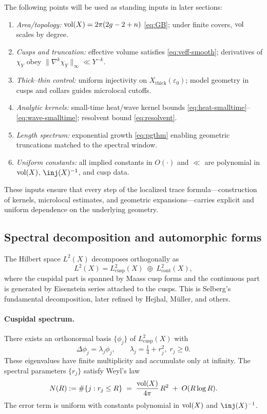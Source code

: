 The following points will be used as standing inputs in later sections:
\begin{enumerate}
  \item \emph{Area/topology:} $\operatorname{vol}(X)=2\pi(2g-2+n)$ \eqref{eq:GB}; under finite covers, $\operatorname{vol}$ scales by degree.
  \item \emph{Cusps and truncation:} effective volume satisfies \eqref{eq:veff-smooth}; derivatives of $\chi_Y$ obey $\|\nabla^k\chi_Y\|_\infty\ll Y^{-k}$.
  \item \emph{Thick--thin control:} uniform injectivity on $X_{\mathrm{thick}}(\varepsilon_0)$; model geometry in cusps and collars guides microlocal cutoffs.
  \item \emph{Analytic kernels:} small-time heat/wave kernel bounds \eqref{eq:heat-smalltime}–\eqref{eq:wave-smalltime}; resolvent bound \eqref{eq:resolvent}.
  \item \emph{Length spectrum:} exponential growth \eqref{eq:pgthm} enabling geometric truncations matched to the spectral window.
  \item \emph{Uniform constants:} all implied constants in $O(\cdot)$ and $\ll$ are polynomial in $\operatorname{vol}(X)$, $\inj(X)^{-1}$, and cusp data.
\end{enumerate}
These inputs ensure that every step of the localized trace formula—construction of kernels, microlocal estimates, and geometric expansions—carries explicit and uniform dependence on the underlying geometry.

\subsection{Spectral decomposition and automorphic forms}\label{subsec:spectral}

The Hilbert space $L^2(X)$ decomposes orthogonally as
\begin{equation}\label{eq:L2dec}
  L^2(X) = L^2_{\mathrm{cusp}}(X) \;\oplus\; L^2_{\mathrm{cont}}(X),
\end{equation}
where the cuspidal part is spanned by Maass cusp forms and the continuous part is generated by Eisenstein series attached to the cusps. This is Selberg’s fundamental decomposition, later refined by Hejhal, Müller, and others.

\paragraph{Cuspidal spectrum.}
There exists an orthonormal basis $\{\phi_j\}$ of $L^2_{\mathrm{cusp}}(X)$ with
\begin{equation}\label{eq:Laplace-cusp}
  \Delta \phi_j = \lambda_j \phi_j, \qquad \lambda_j = \tfrac14 + r_j^2,\; r_j\ge 0.
\end{equation}
These eigenvalues have finite multiplicity and accumulate only at infinity. The spectral parameters $\{r_j\}$ satisfy Weyl’s law
\begin{equation}\label{eq:global-weyl}
  N(R) := \#\{ j : r_j \le R\} \;=\; \frac{\operatorname{vol}(X)}{4\pi}\,R^2 \;+\; O(R\log R).
\end{equation}
The error term is uniform with constants polynomial in $\operatorname{vol}(X)$ and $\inj(X)^{-1}$.

